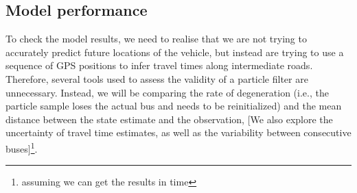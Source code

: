 \subsection{Model performance}
\label{sec:model_perf}

To check the model results, 
we need to realise that we are not trying to accurately predict
future locations of the vehicle,
but instead are trying to use a sequence of GPS positions to infer travel
times along intermediate roads.
Therefore, several tools used to assess the validity of a particle filter
are unnecessary.
Instead, we will be comparing the rate of degeneration 
(i.e., the particle sample loses the actual bus and needs to be reinitialized)
and the mean distance between the state estimate and the observation,
[We also explore the uncertainty of travel time estimates,
as well as the variability between consecutive buses]\footnote{assuming we can get the results in time}.









